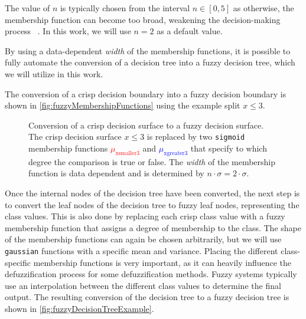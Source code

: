 The value of $n$ is typically chosen from the interval $n\in [0,5]$ as otherwise, the membership function can become too broad, weakening the decision-making process ~\cite{CROCKETT20062809}. In this work, we will use $n=2$ as a default value.

By using a data-dependent \emph{width} of the membership functions, it is possible to fully automate the conversion of a decision tree into a fuzzy decision tree, which we will utilize in this work.


The conversion of a crisp decision boundary into a fuzzy decision boundary is shown in \autoref{fig:fuzzyMembershipFunctions} using the example split $x \leq 3$.



\begin{figure}[h]
    \centering
    \caption[Conversion of crisp tree node into fuzzy tree node]{Conversion of a crisp decision surface to a fuzzy decision surface. The crisp decision surface $x \leq 3$ is replaced by two \texttt{sigmoid} membership functions \textcolor{red}{$\mu_{\text{xsmaller3}}$} and \textcolor{blue}{$\mu_{\text{xgreater3}}$} that specify to which degree the comparison is true or false. The \emph{width} of the membership function is data dependent and is determined by $n\cdot \sigma = 2 \cdot \sigma$.}
    \label{fig:fuzzyMembershipFunctions}
\end{figure}


Once the internal nodes of the decision tree have been converted, the next step is to convert the leaf nodes of the decision tree to fuzzy leaf nodes, representing the class values. This is also done by replacing each crisp class value with a fuzzy membership function that assigns a degree of membership to the class. The shape of the membership functions can again be chosen arbitrarily, but we will use \texttt{gaussian} functions with a specific mean and variance. Placing the different class-specific membership functions is very important, as it can heavily influence the defuzzification process for some defuzzification methods. Fuzzy systems typically use an interpolation between the different class values to determine the final output. The resulting conversion of the decision tree to a fuzzy decision tree is shown in \autoref{fig:fuzzyDecisionTreeExample}.


